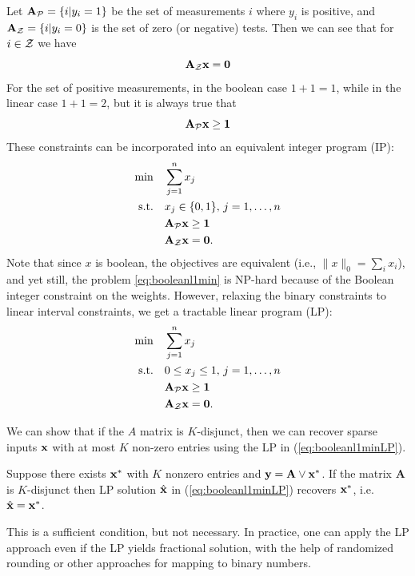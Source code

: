 Let $\mathbf{A}_{\mathcal{P}}= \{i | y_i = 1\}$ be the set of measurements $i$ where $y_i$ is positive, 
and $\mathbf{A}_{\mathcal{Z}} = \{i | y_i = 0\}$ is the set of zero (or negative) tests. Then we can 
see that for $i \in \mathcal{Z}$ we have
\begin{equation}
\mathbf{A}_{\mathcal{Z}}\mathbf{x} = \mathbf{0}
\end{equation}
For the set of positive measurements, in the boolean case $1+1 = 1$, while
in the linear case $1 + 1 = 2$, but it is always true that 
\begin{equation}
\mathbf{A}_{\mathcal{P}}\mathbf{x} \ge \mathbf{1}
\end{equation}
These constraints can be incorporated into an equivalent integer program (IP):
\begin{align}
\label{eq:booleanl1min}
	\min\quad &\sum_{j=1}^{n} x_j \\
	\textrm{s.t.\quad} & x_j \in \{0,1\},\,j = 1,\ldots,n\nonumber\\
		& \mathbf{A}_{\mathcal{P}}\mathbf{x} \ge \mathbf{1}\nonumber\\
		& \mathbf{A}_{\mathcal{Z}}\mathbf{x} = \mathbf{0}.\nonumber
\end{align}
Note that since $x$ is boolean, the objectives are equivalent (i.e., $\|x\|_0=\sum_i{x_i}$), and yet still, the problem
\eqref{eq:booleanl1min} is NP-hard because of the Boolean integer constraint on the weights. However, relaxing the binary constraints to linear interval constraints, we get a tractable linear program (LP):
\begin{align}
\label{eq:booleanl1minLP}
	\min\quad &\sum_{j=1}^{n} x_j \\
	\textrm{s.t.\quad} & 0\leq x_j \leq 1, \,j = 1,\ldots,n\nonumber\\
		& \mathbf{A}_{\mathcal{P}}\mathbf{x} \ge \mathbf{1}\nonumber\\
		& \mathbf{A}_{\mathcal{Z}}\mathbf{x} = \mathbf{0}.\nonumber
\end{align}

We can show that if the $A$ matrix is $K$-disjunct, then we can recover 
sparse inputs $\mathbf{x}$ with at most $K$ non-zero entries using the LP 
in (\ref{eq:booleanl1minLP}). 
\begin{theorem}
\label{thm:LP_recovery}
Suppose there exists $\mathbf{x}^*$ with $K$ nonzero entries and 
$\mathbf{y} = \mathbf{A} \lor \mathbf{x}^*$. If the matrix $\mathbf{A}$ is $K$-disjunct then 
LP solution $\hat{\mathbf{x}}$ in (\ref{eq:booleanl1minLP}) recovers $\mathbf{x}^*$, i.e. $\hat{\mathbf{x}} = \mathbf{x}^*$.
\end{theorem}

This is a sufficient condition, but not necessary. In practice, one can apply
the LP approach even if the LP yields fractional solution, with the help 
of randomized rounding or other approaches for mapping to binary numbers.

